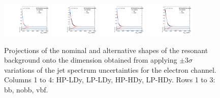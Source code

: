 \begin{figure}[htbp]
  \includegraphics[width=0.21\textwidth]{fig/uncertainties/systs_res_e_LP_vbf_LDy_MVVScaleBinW_ProjX.pdf}
  \includegraphics[width=0.21\textwidth]{fig/uncertainties/systs_res_e_LP_vbf_HDy_MVVScaleBinW_ProjX.pdf}
  \includegraphics[width=0.21\textwidth]{fig/uncertainties/systs_res_e_LP_vbf_LDy_MVVScaleBinTop_ProjX.pdf}
  \includegraphics[width=0.21\textwidth]{fig/uncertainties/systs_res_e_LP_vbf_HDy_MVVScaleBinTop_ProjX.pdf}\\
  \caption{
    Projections of the nominal and alternative shapes of the resonant background onto the \MVV dimension obtained from applying $\pm3\sigma$ variations of the jet \pt spectrum uncertainties for the electron channel.
    Columns 1 to 4: HP-LDy, LP-LDy, HP-HDy, LP-HDy.
    Rows 1 to 3: bb, nobb, vbf.
  }
  \label{fig:systResMVV_MVVScale}
\end{figure}


